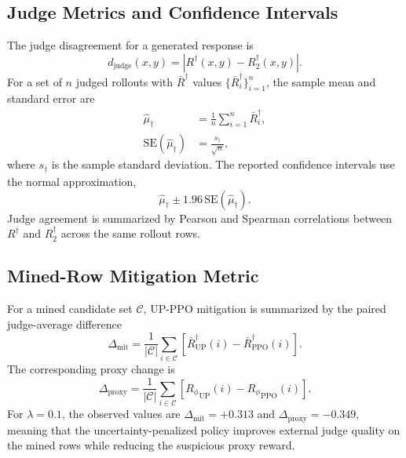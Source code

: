 \documentclass[11pt]{article}
\newcommand{\Rphi}{R_{\phi}}
\newcommand{\Rdag}{R^{\dagger}}
\newcommand{\Rtwo}{R^{\dagger}_2}
\begin{document}
\subsection{Judge Metrics and Confidence Intervals}
The judge disagreement for a generated response is
\begin{equation}
    d_{\mathrm{judge}}(x,y)=|\Rdag(x,y)-\Rtwo(x,y)|.
\end{equation}
For a set of $n$ judged rollouts with $\bar R^\dagger$ values $\{\bar R_i^\dagger\}_{i=1}^n$, the sample mean and standard error are
\begin{align}
    \hat{\mu}_{\dagger}&=\frac{1}{n}\sum_{i=1}^{n}\bar R_i^\dagger,\\
    \mathrm{SE}(\hat{\mu}_{\dagger})&=\frac{s_{\dagger}}{\sqrt{n}},
\end{align}
where $s_{\dagger}$ is the sample standard deviation. The reported confidence intervals use the normal approximation,
\begin{equation}
    \hat{\mu}_{\dagger}\pm 1.96\,\mathrm{SE}(\hat{\mu}_{\dagger}).
\end{equation}
Judge agreement is summarized by Pearson and Spearman correlations between $\Rdag$ and $\Rtwo$ across the same rollout rows.

\subsection{Mined-Row Mitigation Metric}
For a mined candidate set $\mathcal{C}$, UP-PPO mitigation is summarized by the paired judge-average difference
\begin{equation}
    \Delta_{\mathrm{mit}}=\frac{1}{|\mathcal{C}|}\sum_{i\in\mathcal{C}}
    \left[\bar R^\dagger_{\mathrm{UP}}(i)-\bar R^\dagger_{\mathrm{PPO}}(i)\right].
\end{equation}
The corresponding proxy change is
\begin{equation}
    \Delta_{\mathrm{proxy}}=\frac{1}{|\mathcal{C}|}\sum_{i\in\mathcal{C}}
    \left[{\Rphi}_{\mathrm{UP}}(i)-{\Rphi}_{\mathrm{PPO}}(i)\right].
\end{equation}
For $\lambda=0.1$, the observed values are $\Delta_{\mathrm{mit}}=+0.313$ and $\Delta_{\mathrm{proxy}}=-0.349$, meaning that the uncertainty-penalized policy improves external judge quality on the mined rows while reducing the suspicious proxy reward.
\end{document}

